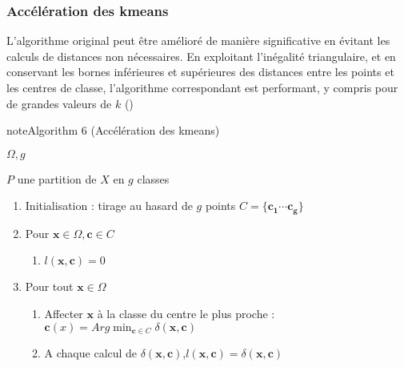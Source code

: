 \documentclass[letterpaper,10pt,english]{jupyterBook}
\begin{document}
\subsubsection{Accélération des k\sphinxhyphen{}means}
\label{\detokenize{clustering:acceleration-des-k-means}}
\sphinxAtStartPar
L’algorithme original peut être amélioré de manière significative en évitant les calculs de distances non nécessaires. En exploitant l’inégalité triangulaire, et en conservant les bornes inférieures et supérieures des distances entre les points et les centres de classe, l’algorithme correspondant est performant, y compris pour de grandes valeurs de \(k\) ({\hyperref[\detokenize{clustering:km}]{}})
\label{clustering:km}
\begin{sphinxadmonition}{note}{Algorithm 6 (Accélération des k\sphinxhyphen{}means)}



\sphinxAtStartPar
{} \(\Omega, g\)

\sphinxAtStartPar
{} \(P\) une partition de \(X\) en \(g\) classes
\begin{enumerate}
%
\item {} 
\sphinxAtStartPar
Initialisation : tirage au hasard de \(g\) points \(C =\{\mathbf {c_1}\cdots \mathbf {c_g\}}\)

\item {} 
\sphinxAtStartPar
Pour \(\mathbf x\in \Omega,\mathbf c\in C\)
\begin{enumerate}
%
\item {} 
\sphinxAtStartPar
\(l(\mathbf x,\mathbf c)=0\)

\end{enumerate}

\item {} 
\sphinxAtStartPar
Pour tout \(\mathbf x\in \Omega\)
\begin{enumerate}
%
\item {} 
\sphinxAtStartPar
Affecter \(\mathbf x\) à la classe du centre le plus proche : \(\mathbf c(x) = Arg \displaystyle\min_{\mathbf c\in C} \delta(\mathbf x,\mathbf c)\)

\item {} 
\sphinxAtStartPar
A chaque calcul de \(\delta(\mathbf x,\mathbf c)\),\( l(\mathbf x,\mathbf c)=\delta(\mathbf x,\mathbf c)\)


\end{enumerate}
\end{enumerate}
\end{sphinxadmonition}
\end{document}

